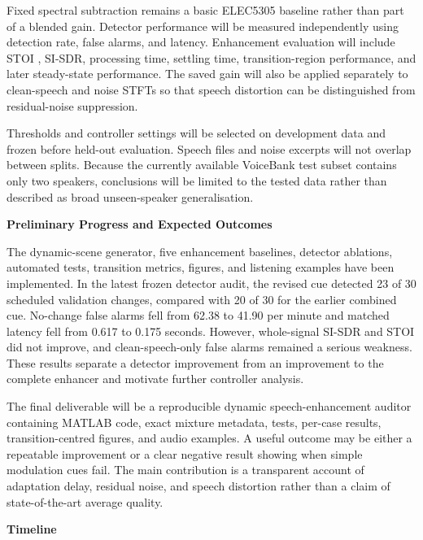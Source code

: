 \documentclass[11pt,a4paper]{article}
\newcommand{\projectsection}[1]{%
  \vspace{0.25em}%
  {\large\bfseries\color{accent} #1}\par
  \vspace{0.1em}%
}
\begin{document}
Fixed spectral subtraction remains a basic ELEC5305 baseline rather than part of a blended gain. Detector performance will be measured independently using detection rate, false alarms, and latency. Enhancement evaluation will include STOI \cite{taal2011}, SI-SDR, processing time, settling time, transition-region performance, and later steady-state performance. The saved gain will also be applied separately to clean-speech and noise STFTs so that speech distortion can be distinguished from residual-noise suppression.

Thresholds and controller settings will be selected on development data and frozen before held-out evaluation. Speech files and noise excerpts will not overlap between splits. Because the currently available VoiceBank test subset contains only two speakers, conclusions will be limited to the tested data rather than described as broad unseen-speaker generalisation.

\projectsection{Preliminary Progress and Expected Outcomes}

The dynamic-scene generator, five enhancement baselines, detector ablations, automated tests, transition metrics, figures, and listening examples have been implemented. In the latest frozen detector audit, the revised cue detected 23 of 30 scheduled validation changes, compared with 20 of 30 for the earlier combined cue. No-change false alarms fell from 62.38 to 41.90 per minute and matched latency fell from 0.617 to 0.175 seconds. However, whole-signal SI-SDR and STOI did not improve, and clean-speech-only false alarms remained a serious weakness. These results separate a detector improvement from an improvement to the complete enhancer and motivate further controller analysis.

The final deliverable will be a reproducible dynamic speech-enhancement auditor containing MATLAB code, exact mixture metadata, tests, per-case results, transition-centred figures, and audio examples. A useful outcome may be either a repeatable improvement or a clear negative result showing when simple modulation cues fail. The main contribution is a transparent account of adaptation delay, residual noise, and speech distortion rather than a claim of state-of-the-art average quality.

\projectsection{Timeline}
\end{document}
